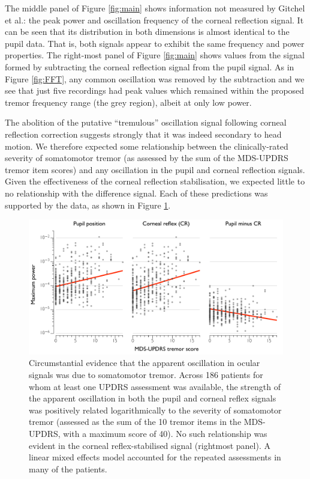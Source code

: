 \documentclass[jou,a4paper]{apa6}
\begin{document}
The middle panel of Figure \ref{fig:main} shows information not measured by Gitchel et al.: the peak power and oscillation frequency of the corneal reflection signal. It can be seen that its distribution in both dimensions is almost identical to the pupil data. That is, both signals appear to exhibit the same frequency and power properties. The right-most panel of Figure \ref{fig:main} shows values from the signal formed by subtracting the corneal reflection signal from the pupil signal. As in Figure \ref{fig:FFT}, any common oscillation was removed by the subtraction and we see that just five recordings had peak values which remained within the proposed tremor frequency range (the grey region), albeit at only low power.

The abolition of the putative ``tremulous'' oscillation signal following corneal reflection correction suggests strongly that it was indeed secondary to head motion. We therefore expected some relationship between the clinically-rated severity of somatomotor tremor (as assessed by the sum of the MDS-UPDRS tremor item scores) and any oscillation in the pupil and corneal reflection signals. Given the effectiveness of the corneal reflection stabilisation, we expected little to no relationship with the difference signal. Each of these predictions was supported by the data, as shown in Figure \ref{fig:UPDRS}.

\begin{figure}[htbp]
\begin{center}
\includegraphics {Figures/Figure_5_UPDRS_correlation}
\caption{Circumstantial evidence that the apparent oscillation in ocular signals was due to somatomotor tremor. Across 186 patients for whom at least one UPDRS assessment was available, the strength of the apparent oscillation in both the pupil and corneal reflex signals was positively related logarithmically to the severity of somatomotor tremor (assessed as the sum of the 10 tremor items in the MDS-UPDRS, with a maximum score of 40). No such relationship was evident in the corneal reflex-stabilised signal (rightmost panel). A linear mixed effects model accounted for the repeated assessments in many of the patients.
}
\label{fig:UPDRS}
\end{center}
\end{figure}
\end{document}
